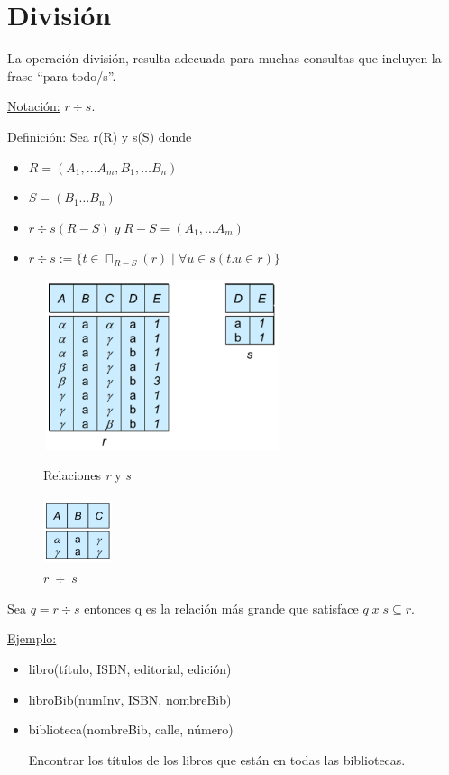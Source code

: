 \documentclass[12pt,a4paper]{report}
\begin{document}
	\section{División}
		\par La operación división, resulta adecuada para muchas consultas que incluyen la frase “para todo/s”.
		\vspace{5mm}
		\par \underline{Notación:} $r \div s$.
		\vspace{3mm}
		\par Definición: Sea r(R) y s(S) donde
		\begin{itemize}
			\item $R = (A_{1}, \dotsc A_{m}, B_{1}, \dotsc B_{n})$
			\item $S = (B_{1} \dotsc B_{n})$
			\item $r \div s(R - S) \; y \; R - S = (A_{1}, \dotsc A_{m})$
			\item $r \div s := \lbrace t \in \sqcap_{R-S}(r) \; | \; \forall u \in s (t.u \in r) \rbrace$
		\end{itemize}

		\begin{figure}[htb]
				\centering
				\includegraphics[width=7cm, height=5cm]{./imagenes/div1.png}
				\caption{Relaciones \textit{r} y \textit{s}}
				\vspace{5mm}
				\includegraphics[width=2cm, height=2cm]{./imagenes/div2.png}
				\caption{$r \; \div \; s$}
		\end{figure}
		
		\par Sea $q = r \div s$ entonces q es la relación más grande que satisface $q \; x \; s \subseteq r$.

		\vspace{5mm}
		\underline{Ejemplo:}
		\begin{itemize}
			\item libro(título, ISBN, editorial, edición)
			\item libroBib(numInv, ISBN, nombreBib)
			\item biblioteca(nombreBib, calle, número)
			\par Encontrar los títulos de los libros que están en todas las bibliotecas.
		\end{itemize}
 
\end{document}
